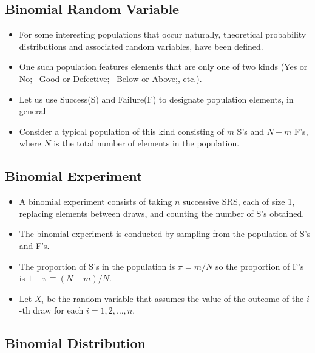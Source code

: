 \documentclass[
  letterpaper,
  DIV=11,
  numbers=noendperiod]{scrartcl}
\begin{document}
\subsection{Binomial Random Variable}\label{binomial-random-variable}

\begin{itemize}
\item
  For some interesting populations that occur naturally, theoretical
  probability distributions and associated random variables, have been
  defined.
\item
  One such population features elements that are only one of two kinds
  (Yes or No; ~Good or Defective; ~Below or Above;, etc.).
\item
  Let us use {Success(S)} and {Failure(F)} to designate population
  elements, in general
\item
  Consider a typical population of this kind consisting of \(m\) {S}'s
  and \(N-m\) {F}'s, where \(N\) is the total number of elements in the
  population.
\end{itemize}

\subsection{Binomial Experiment}\label{binomial-experiment}

\begin{itemize}
\item
  A {binomial experiment} consists of taking \(n\) successive SRS, each
  of size 1, replacing elements between draws, and counting the number
  of {S}'s obtained.
\item
  The binomial experiment is conducted by sampling from the population
  of {S}'s and {F}'s.
\item
  The proportion of {S}'s in the population is \(\pi = m/N\) so the
  proportion of {F}'s is \(1 - \pi \equiv (N-m)/N\).
\item
  Let \(X_i\) be the random variable that assumes the value of the
  outcome of the \(i\)-th draw for each \(i=1,2,\ldots,n\).
\end{itemize}

\subsection{Binomial Distribution}\label{binomial-distribution}
\end{document}
